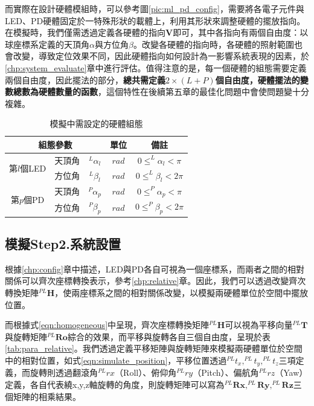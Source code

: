 而實際在設計硬體模組時，可以參考圖\ref{pic:ml_pd_config}，需要將各電子元件與LED、PD硬體固定於一特殊形狀的載體上，利用其形狀來調整硬體的擺放指向。在模擬時，我們僅需透過定義各硬體的指向$\boldsymbol{V}$即可，其中各指向有兩個自由度：以球座標系定義的天頂角$\alpha$與方位角$\beta$。改變各硬體的指向時，各硬體的照射範圍也會改變，導致定位效果不同，因此硬體指向如何設計為一影響系統表現的因素，於\ref{chp:system_evaluate}章中進行評估。值得注意的是，每一個硬體的組態需要定義兩個自由度，因此擺法的部分，\textbf{總共需定義$2\times(L+P)$個自由度，硬體擺法的變數總數為硬體數量的函數}，這個特性在後續第五章的最佳化問題中會使問題變十分複雜。

\begin{table}[htpb]
    \renewcommand{\arraystretch}{1.3}
    \setlength{\arrayrulewidth}{0.15mm}
    \setlength{\doublerulesep}{0.12mm}
    \caption{模擬中需設定的硬體組態}
    \label{tab:para_config}
    \centering
    \begin{tabular}{|c|cc|c|c|}
    \hline
    \multicolumn{3}{|c|}{\textbf{組態參數}}  &\textbf{單位}  &  \textbf{備註}   \\
    \hline
    \multirow{2}{*}{第$l$個LED} 
    & 天頂角 &$^L \alpha_l$ & $rad$ & $0\leq ^L \alpha_l<\pi$ \\
     & 方位角& $^L \beta_l$& $rad$ & $0\leq ^L \beta_l<2\pi$ \\\hline
    \multirow{2}{*}{第$p$個PD} 
    & 天頂角 &$^P \alpha_p$ & $rad$ & $0\leq ^P \alpha_p<\pi$ \\
    & 方位角& $^P \beta_p$& $rad$ & $0\leq ^P \beta_p<2\pi$ \\\hline
    \end{tabular}
    \end{table}

    

\subsection{模擬Step2.系統設置}
\label{chp:simulate_position}



根據\ref{chp:config}章中描述，LED與PD各自可視為一個座標系，而兩者之間的相對關係可以齊次座標轉換表示，參考\ref{chp:relative}章。因此，我們可以透過改變齊次轉換矩陣$^{PL}\boldsymbol{H}$，使兩座標系之間的相對關係改變，以模擬兩硬體單位於空間中擺放位置。

而根據式\ref{eqn:homogeneous}中呈現，齊次座標轉換矩陣$^{PL}\boldsymbol{H}$可以視為平移向量$^{PL}\boldsymbol{T}$與旋轉矩陣$^{PL}\boldsymbol{Ro}$綜合的效果，而平移與旋轉各自三個自由度，呈現於表\ref{tab:para_relative}。我們透過定義平移矩陣與旋轉矩陣來模擬兩硬體單位於空間中的相對位置，如式\ref{eqn:simulate_position}，平移位置透過$^{PL}t_x,^{PL}t_y,^{PL}t_z$三項定義，而旋轉則透過翻滾角$^{PL}rx$（Roll）、俯仰角$^{PL}ry$（Pitch）、偏航角$^{PL}rz$（Yaw）定義，各自代表繞x,y,z軸旋轉的角度，則旋轉矩陣可以寫為$^{PL}\boldsymbol{Rx},^{PL}\boldsymbol{Ry},^{PL}\boldsymbol{Rz}$三個矩陣的相乘結果。

